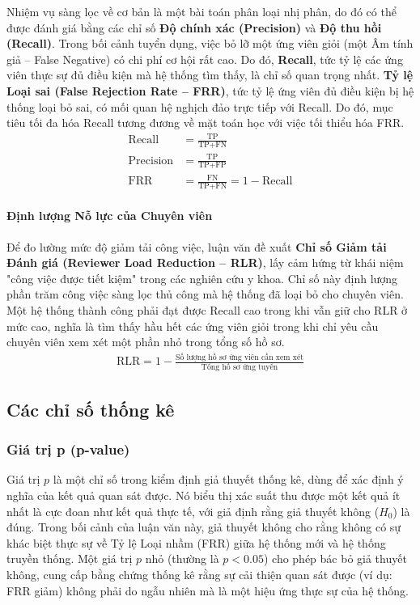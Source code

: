 \documentclass{article}
\begin{document}
Nhiệm vụ sàng lọc về cơ bản là một bài toán phân loại nhị phân, do đó có thể được đánh giá bằng các chỉ số \textbf{Độ chính xác (Precision)} và \textbf{Độ thu hồi (Recall)}. Trong bối cảnh tuyển dụng, việc bỏ lỡ một ứng viên giỏi (một Âm tính giả – False Negative) có chi phí cơ hội rất cao. Do đó, \textbf{Recall}, tức tỷ lệ các ứng viên thực sự đủ điều kiện mà hệ thống tìm thấy, là chỉ số quan trọng nhất. \textbf{Tỷ lệ Loại sai (False Rejection Rate – FRR)}, tức tỷ lệ ứng viên đủ điều kiện bị hệ thống loại bỏ sai, có mối quan hệ nghịch đảo trực tiếp với Recall. Do đó, mục tiêu tối đa hóa Recall tương đương về mặt toán học với việc tối thiểu hóa FRR.
\begin{align*}
\text{Recall} &=\frac{\text{TP}}{\text{TP} + \text{FN}} \\
\text{Precision}&= \frac{\text{TP}}{\text{TP} + \text{FP}} \\
\text{FRR} &=\frac{\text{FN}}{\text{TP} + \text{FN}} = 1 - \text{Recall}
\end{align*}

\paragraph{Định lượng Nỗ lực của Chuyên viên}
Để đo lường mức độ giảm tải công việc, luận văn đề xuất \textbf{Chỉ số Giảm tải Đánh giá (Reviewer Load Reduction – RLR)}, lấy cảm hứng từ khái niệm "công việc được tiết kiệm" trong các nghiên cứu y khoa. Chỉ số này định lượng phần trăm công việc sàng lọc thủ công mà hệ thống đã loại bỏ cho chuyên viên. Một hệ thống thành công phải đạt được Recall cao trong khi vẫn giữ cho RLR ở mức cao, nghĩa là tìm thấy hầu hết các ứng viên giỏi trong khi chỉ yêu cầu chuyên viên xem xét một phần nhỏ trong tổng số hồ sơ.
\begin{align*}
\text{RLR} = 1-\frac{\text{Số lượng hồ sơ ứng viên cần xem xét}}{\text{Tổng hồ sơ ứng tuyển}}
\end{align*}

\subsection{Các chỉ số thống kê}
\subsubsection{Giá trị p (p-value)}
Giá trị $p$ là một chỉ số trong kiểm định giả thuyết thống kê, dùng để xác định ý nghĩa của kết quả quan sát được. Nó biểu thị xác suất thu được một kết quả ít nhất là cực đoan như kết quả thực tế, với giả định rằng giả thuyết không ($H_0$) là đúng. Trong bối cảnh của luận văn này, giả thuyết không cho rằng không có sự khác biệt thực sự về Tỷ lệ Loại nhầm (FRR) giữa hệ thống mới và hệ thống truyền thống. Một giá trị $p$ nhỏ (thường là $p<0.05$) cho phép bác bỏ giả thuyết không, cung cấp bằng chứng thống kê rằng sự cải thiện quan sát được (ví dụ: FRR giảm) không phải do ngẫu nhiên mà là một hiệu ứng thực sự của hệ thống.
\end{document}
